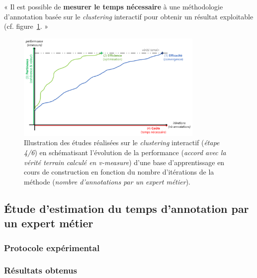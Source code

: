 		\begin{tcolorbox}[
			title=\textbf{Hypothèse sur les coûts},
			colback=gray!20,
			colframe=gray!50!black!75,
			width=\linewidth
		]
			« Il est possible de \textbf{mesurer le temps nécessaire} à une méthodologie d'annotation basée sur le \textit{clustering} interactif pour obtenir un résultat exploitable (cf. figure~\ref{figure:HYPOTHESE-COUTS}. »
			
			
			\begin{figure}[H]
				\centering
				\includegraphics[width=0.8\textwidth]{figures/hypotheses-04-couts}
				\caption{Illustration des études réalisées sur le \textit{clustering} interactif (\textit{étape 4/6}) en schématisant l'évolution de la performance (\textit{accord avec la vérité terrain calculé en v-measure}) d'une base d'apprentissage en cours de construction en fonction du nombre d'itérations de la méthode (\textit{nombre d'annotations par un expert métier}).}
				\label{figure:HYPOTHESE-COUTS}
			\end{figure}

		\end{tcolorbox}
		
		\subsection{Étude d'estimation du temps d'annotation par un expert métier}
		
			\subsubsection{Protocole expérimental}

			\subsubsection{Résultats obtenus}


